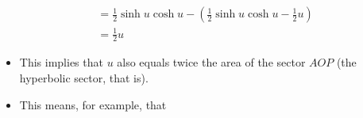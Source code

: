 \documentclass[../main.tex]{subfiles}
\begin{document}
\begin{itemize}
\begin{align*}
        &= \frac{1}{2}\sinh u\cosh u - \left( \frac{1}{2}\sinh u\cosh u-\frac{1}{2}u \right)\\
        &= \frac{1}{2}u
    \end{align*}
    \begin{itemize}
        \item This implies that $u$ also equals twice the area of the sector $AOP$ (the hyperbolic sector, that is).
        \item This means, for example, that 
    \end{itemize}
\end{itemize}
\end{document}
